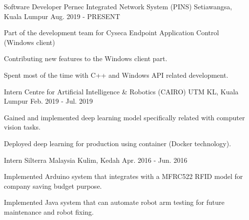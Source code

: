 

\begin{cventries}


\cventry
    {Software Developer}
    {Pernec Integrated Network System (PINS)}
    {Setiawangsa, Kuala Lumpur}
    {Aug. 2019 - PRESENT}
    {
      \begin{cvitems}
        \item {Part of the development team for Cyseca Endpoint Application Control (Windows client)}
        \item {Contributing new features to the Windows client part.}
        \item {Spent most of the time with C++ and Windows API related development.}
      \end{cvitems}
    }

    \cventry
    {Intern}
    {Centre for Artificial Intelligence \& Robotics (CAIRO)}
    {UTM KL, Kuala Lumpur}
    {Feb. 2019 - Jul. 2019}
    {
      \begin{cvitems}
        \item {Gained and implemented deep learning model specifically related with computer vision tasks.}
        \item {Deployed deep learning for production using container (Docker technology).}
      \end{cvitems}
    }

  \cventry
    {Intern}
    {Silterra Malaysia}
    {Kulim, Kedah}
    {Apr. 2016 - Jun. 2016}
    {
      \begin{cvitems}
        \item {Implemented Arduino system that integrates with a MFRC522 RFID model for company saving budget purpose.}
        \item {Implemented Java system that can automate robot arm testing for future maintenance and robot fixing.}
      \end{cvitems}
    }

  

    

\end{cventries}
